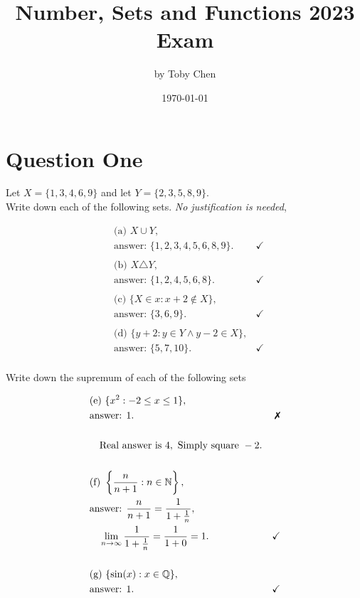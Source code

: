 \documentclass{article}
\title{Number, Sets and Functions 2023 Exam}
\author{by Toby Chen}
\date{\today}
\begin{document}
    \maketitle

    \tableofcontents

    \section{Question One}
        Let $X = \{1,3,4,6,9\}$ and let $Y = \{2,3,5,8,9\}$.\\ Write down each of the following sets. \textit{No justification is needed},

        \begin{align*}
            &\text{(a) } X\cup Y,\\
            &\text{answer: } \{1,2,3,4,5,6,8,9\}. &\checkmark\\
            &\\
            &\text{(b) }X\triangle Y,\\
            &\text{answer: } \{1,2,4,5,6,8\}. &\checkmark\\
            &\\
            &\text{(c) } \{X\in x: x+2 \notin X\},\\
            &\text{answer: } \{3,6,9\}. &\checkmark\\
            &\\
            &\text{(d) } \{y+2 : y\in Y \land y-2 \in X\},\\
            &\text{answer: } \{5,7,10\}. &\checkmark\\
        \end{align*}

        Write down the supremum of each of the following sets

        \begin{align*}
            &\text{(e) } \{x^2 : -2 \leq x \leq 1\},\\
            &\text{answer: } 1.&\xmark\\
            &\\
            &\quad\text{Real answer is }4, \text{ Simply square }-2.\\
            &\\
            &\text{(f) } \left\{\frac{n}{n+1}: n \in \mathbb{N}\right\},\\
            &\text{answer: } \frac{n}{n+1} = \frac{1}{1 + \frac{1}{n}},\\
            &\quad\lim_{n\rightarrow \infty}\frac{1}{1 + \frac{1}{n}} = \frac{1}{1 + 0} = 1.&\checkmark\\
            &\\
            &\text{(g) } \{\sin(x) : x\in \mathbb{Q}\},\\
            &\text{answer: }1. &\checkmark\\
        \end{align*}
\end{document}
